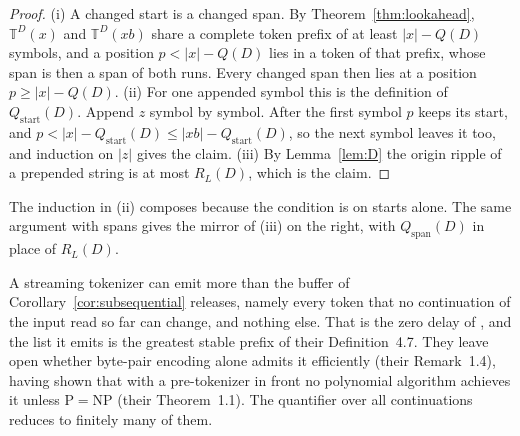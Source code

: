 \documentclass[11pt,a4paper]{article}
\theoremstyle{definition}
\theoremstyle{plain}
\newcommand{\T}{\mathbb{T}}
\newcommand{\ripple}{R_{L}}
\begin{document}
\begin{proof}
(i) A changed start is a changed span. By Theorem~\ref{thm:lookahead}, \(\T^D(x)\) and \(\T^D(xb)\) share a complete
token prefix of at least \(|x| - Q(D)\) symbols, and a position \(p < |x| - Q(D)\) lies in a token of that prefix, whose
span is then a span of both runs. Every changed span then lies at a position \(p \ge |x| - Q(D)\). (ii) For one appended
symbol this is the definition of \(Q_{\mathrm{start}}(D)\). Append \(z\) symbol by symbol. After the first symbol \(p\)
keeps its start, and \(p < |x| - Q_{\mathrm{start}}(D) \le |xb| - Q_{\mathrm{start}}(D)\), so the next symbol leaves it
too, and induction on \(|z|\) gives the claim. (iii) By Lemma~\ref{lem:D} the origin ripple of a prepended string is at
most \(\ripple(D)\), which is the claim.
\end{proof}

The induction in (ii) composes because the condition is on starts alone. The same argument with spans gives the mirror
of (iii) on the right, with \(Q_{\mathrm{span}}(D)\) in place of \(\ripple(D)\).

A streaming tokenizer can emit more than the buffer of Corollary~\ref{cor:subsequential} releases, namely every token
that no continuation of the input read so far can change, and nothing else. That is the zero delay of
\citet[Definition~4.9]{dalirrooyfard2026online}, and the list it emits is the greatest stable prefix of their
Definition~4.7. They leave open whether byte-pair encoding alone admits it efficiently (their Remark~1.4), having shown
that with a pre-tokenizer in front no polynomial algorithm achieves it unless \(\mathrm{P} = \mathrm{NP}\) (their
Theorem~1.1). The quantifier over all continuations reduces to finitely many of them.
\end{document}
